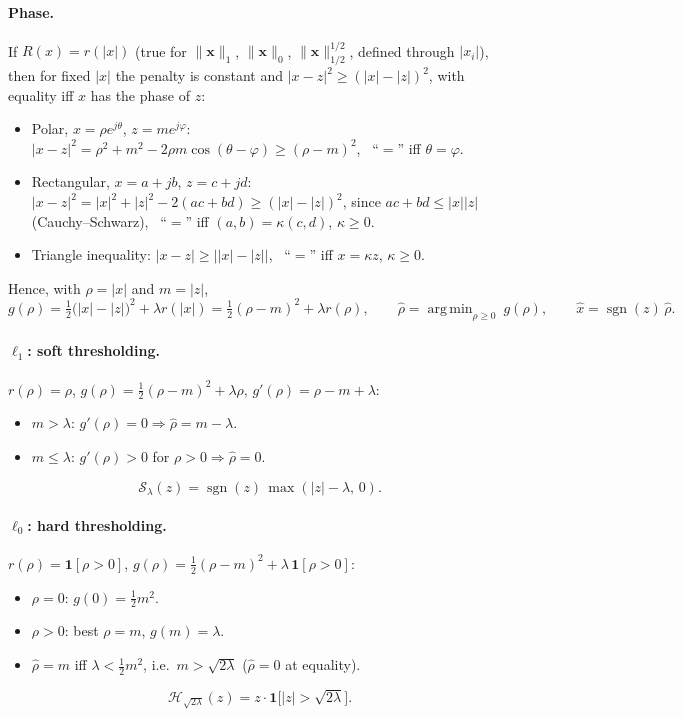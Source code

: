 \documentclass[11pt,a4paper]{article}
\theoremstyle{definition}
\DeclareMathOperator*{\argmin}{arg\,min}
\DeclareMathOperator{\sgn}{sgn}
\begin{document}
\paragraph{Phase.} If $R(x) = r(|x|)$ (true for $\lVert\mathbf x\rVert_1$, $\lVert\mathbf x\rVert_0$, $\lVert\mathbf x\rVert_{1/2}^{1/2}$,
defined through $|x_i|$), then for fixed $|x|$ the penalty is constant and $|x-z|^2 \ge (|x|-|z|)^2$,
with equality iff $x$ has the phase of $z$:
\begin{itemize}
  \item Polar, $x=\rho e^{j\theta}$, $z=me^{j\varphi}$:
        $|x-z|^2 = \rho^2+m^2-2\rho m\cos(\theta-\varphi) \ge (\rho-m)^2$, \ ``$=$'' iff $\theta=\varphi$.
  \item Rectangular, $x=a+jb$, $z=c+jd$:
        $|x-z|^2 = |x|^2+|z|^2-2(ac+bd) \ge (|x|-|z|)^2$, since $ac+bd\le|x||z|$ (Cauchy--Schwarz),
        \ ``$=$'' iff $(a,b)=\kappa(c,d)$, $\kappa\ge0$.
  \item Triangle inequality: $|x-z| \ge \bigl||x|-|z|\bigr|$, \ ``$=$'' iff $x=\kappa z$, $\kappa\ge0$.
\end{itemize}
Hence, with $\rho=|x|$ and $m=|z|$,
\[
  g(\rho) = \tfrac12\bigl(|x|-|z|\bigr)^2 + \lambda r(|x|) = \tfrac12(\rho-m)^2 + \lambda r(\rho),\qquad
  \hat\rho = \argmin_{\rho\ge0}\ g(\rho),\qquad \hat x = \sgn(z)\,\hat\rho .
\]

\paragraph{$\ell_1$: soft thresholding.} $r(\rho)=\rho$, $g(\rho)=\tfrac12(\rho-m)^2+\lambda\rho$, $g'(\rho)=\rho-m+\lambda$:
\begin{itemize}
  \item $m>\lambda$: $g'(\rho)=0 \Rightarrow \hat\rho = m-\lambda$.
  \item $m\le\lambda$: $g'(\rho)>0$ for $\rho>0 \Rightarrow \hat\rho = 0$.
\end{itemize}
\[
  \mathcal S_\lambda(z) = \sgn(z)\,\max(|z|-\lambda,\,0).
\]

\paragraph{$\ell_0$: hard thresholding.} $r(\rho)=\mathbf 1[\rho>0]$, $g(\rho)=\tfrac12(\rho-m)^2+\lambda\,\mathbf 1[\rho>0]$:
\begin{itemize}
  \item $\rho=0$: $g(0)=\tfrac12 m^2$.
  \item $\rho>0$: best $\rho=m$, $g(m)=\lambda$.
  \item $\hat\rho = m$ iff $\lambda<\tfrac12m^2$, i.e.\ $m>\sqrt{2\lambda}$ ($\hat\rho=0$ at equality).
\end{itemize}
\[
  \mathcal H_{\sqrt{2\lambda}}(z) = z\cdot\mathbf 1\bigl[|z|>\sqrt{2\lambda}\bigr].
\]
\end{document}
